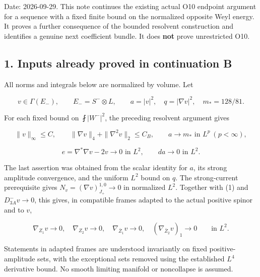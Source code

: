 \documentclass[11pt]{article}
\begin{document}
Date: 2026-09-29. This note continues the existing actual O10 endpoint
argument for a sequence with a fixed finite bound on the normalized
opposite Weyl energy. It proves a further consequence of the bounded
resolvent construction and identifies a genuine next coefficient bundle.
It does \textbf{not} prove unrestricted O10.

\hypertarget{inputs-already-proved-in-continuation-b}{%
\subsection{1. Inputs already proved in continuation
B}\label{inputs-already-proved-in-continuation-b}}

All norms and integrals below are normalized by volume. Let

\[
 v\in\Gamma(E_-),\qquad E_-=S^-\otimes L,\qquad
 a=|v|^2,\quad q=|\nabla v|^2,\quad m_*=128/81.
\]

For each fixed bound on \(\fint |W^-|^2\), the preceding resolvent
argument gives

\[
 \|v\|_\infty\le C,\qquad
 \|\nabla v\|_4+\|\nabla^2v\|_2\le C_B,
 \qquad a\to m_*\text{ in }L^p\ (p<\infty),
\]

\[
 e=\nabla^*\nabla v-2v\to0\text{ in }L^2,
 \qquad da\to0\text{ in }L^2.
\tag{C.1}
\]

The last assertion was obtained from the scalar identity for \(a\), its
strong amplitude convergence, and the uniform \(L^2\) bound on \(q\).
The strong-current prerequisite gives \(N_v=(\nabla v)^{1,0}_{J_+}\to0\)
in normalized \(L^2\). Together with (1) and \(D^-_{3A}v\to0\), this
gives, in compatible frames adapted to the actual positive spinor and to
\(v\),

\[
 \nabla_{Z_1}v\to0,\quad \nabla_{Z_2}v\to0,
 \quad \nabla_{\bar Z_1}v\to0,
 \quad (\nabla_{\bar Z_2}v)_1\to0
 \qquad\text{in }L^2.
\tag{C.2}
\]

Statements in adapted frames are understood invariantly on fixed
positive-amplitude sets, with the exceptional sets removed using the
established \(L^4\) derivative bound. No smooth limiting manifold or
noncollapse is assumed.
\end{document}

